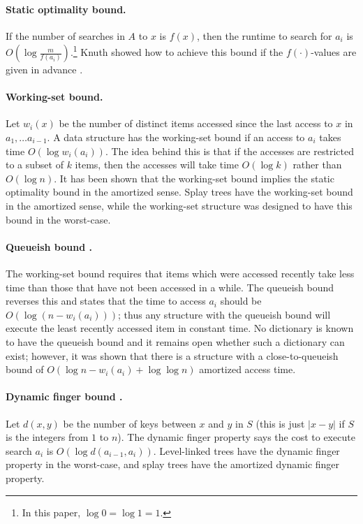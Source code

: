 \documentclass{llncs}
\newcommand{\BigOh}[1]{O\!\left(#1\right)}
\begin{document}
\paragraph{Static optimality bound.} If the number of searches in $A$ to $x$ is $f(x)$, then the runtime to search for $a_i$ is $\BigOh{\log \frac{m}{f(a_i)}}$.\footnote{In this paper,  $\log 0=\log 1=1$.} Knuth showed how to achieve this bound if the $f(\cdot)$-values are given in advance \cite{DBLP:journals/acta/Knuth71}.

\paragraph{Working-set bound.} Let $w_i(x)$ be the number of distinct items accessed since the last access to $x$ in $a_1, \ldots a_{i-1}$. A data structure has the working-set bound if an access to $a_i$ takes time $\BigOh{\log w_i(a_i)}$. The idea behind this is that if the accesses are restricted to a subset of $k$ items, then the accesses will take time $\BigOh{\log k}$ rather than $\BigOh{\log n}$. It has been shown that the working-set bound implies the static optimality bound in the amortized sense. Splay trees \cite{DBLP:journals/jacm/SleatorT85} have the working-set bound in the amortized sense, while the working-set structure \cite{DBLP:conf/soda/Iacono01a} was designed to have this bound in the worst-case.

\paragraph{Queueish bound \cite{DBLP:journals/algorithmica/IaconoL05}.} The working-set bound requires that items which were accessed recently take less time than those that have not been accessed in a while. The queueish bound reverses this and states that the time to access $a_i$ should be $\BigOh{\log( n-w_i(a_i))}$; thus any structure with the queueish bound will execute the least recently accessed item in constant time. No dictionary is known to have the queueish bound and it remains open whether such a dictionary can exist; however, it was shown that there is a structure with a close-to-queueish bound of $\BigOh{\log n-w_i(a_i)+\log \log n}$ amortized access time.

\paragraph{Dynamic finger bound \cite{DBLP:journals/siamcomp/ColeMSS00,DBLP:journals/siamcomp/Cole00}.} Let $d(x,y)$ be the number of keys between $x$ and $y$ in $S$ (this is just $|x-y|$ if $S$ is the integers from $1$ to $n$). The dynamic finger property says the cost to execute search $a_i$ is $\BigOh{\log d(a_{i-1},a_i)}$. Level-linked trees \cite{DBLP:journals/iandc/HoffmanMRT86} have the dynamic finger property in the worst-case, and splay trees have the amortized dynamic finger property.
\end{document}
